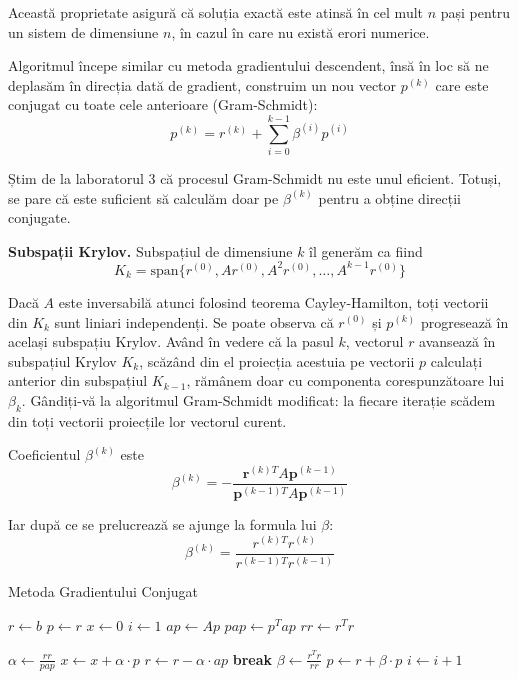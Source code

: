 \documentclass{exam}
\begin{document}
Această proprietate asigură că soluția exactă este atinsă în cel mult $n$ pași
pentru un sistem de dimensiune $n$, în cazul în care nu există erori numerice.

Algoritmul începe similar cu metoda gradientului descendent, însă în loc să ne
deplasăm în direcția dată de gradient, construim un nou vector $p^{(k)}$ care
este conjugat cu toate cele anterioare (Gram-Schmidt):
\begin{equation*}
	p^{(k)} = r^{(k)} + \sum_{i=0}^{k-1} \beta^{(i)} p^{(i)}
\end{equation*}

Știm de la laboratorul 3 că procesul Gram-Schmidt nu este unul eficient. Totuși,
se pare că este suficient să calculăm doar pe $\beta^{(k)}$ pentru a obține
direcții conjugate.

\textbf{Subspații Krylov.} Subspațiul de dimensiune $k$ îl generăm ca fiind
\begin{equation*}
	K_k = \text{span}\{r^{(0)}, Ar^{(0)}, A^2 r^{(0)}, \ldots, A^{k-1} r^{(0)}\}
\end{equation*}

Dacă $A$ este inversabilă atunci folosind teorema Cayley-Hamilton, toți vectorii
din $K_k$ sunt liniari independenți. Se poate observa că $r^{(0)}$ și $p^{(k)}$
progresează în același subspațiu Krylov. Având în vedere că la pasul $k$,
vectorul $r$ avansează în subspațiul Krylov $K_k$, scăzând din el proiecția
acestuia pe vectorii $p$ calculați anterior din subspațiul $K_{k-1}$, rămânem
doar cu componenta corespunzătoare lui $\beta_k$. Gândiți-vă la algoritmul
Gram-Schmidt modificat: la fiecare iterație scădem din toți vectorii proiecțile
lor vectorul curent.

Coeficientul $\beta^{(k)}$ este
\begin{equation*}
	\beta^{(k)} = -\frac{\mathbf{r}^{(k)T} A \mathbf{p}^{(k-1)}}{\mathbf{p}^{(k-1)T} A \mathbf{p}^{(k-1)}}
\end{equation*}

Iar după ce se prelucrează se ajunge la formula lui $\beta$:
\begin{equation*}
	\beta^{(k)} = \frac{r^{(k)T} r^{(k)}}{r^{(k-1)T} r^{(k-1)}}
\end{equation*}

\begin{algorithm}
	\caption{Metoda Gradientului Conjugat}
	\begin{algorithmic}[1]
		\State $r \gets b$
		\State $p\gets r$
		\State $x \gets 0$
		\State $i \gets 1$
		\State $ap \gets A p$
		\State $pap \gets p^T ap$
		\State $rr \gets r^T r$

		\State $\alpha \gets \frac{rr}{pap}$
		\State $x \gets x + \alpha\cdot p$
		\State $r \gets r - \alpha \cdot ap$
		\State \textbf{break}
		\EndIf
		\State $\beta \gets \frac{r^T r}{rr}$
		\State $p \gets r + \beta \cdot p$
		\State $i \gets i + 1$
		\EndWhile
	\end{algorithmic}
\end{algorithm}
\end{document}

